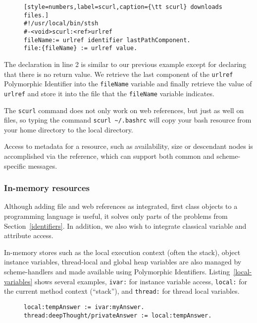 \documentclass[preprint]{sigplanconf}
\begin{document}
\begin{figure}[htbp]
\begin{lstlisting}[style=numbers,label=scurl,caption={\tt scurl} downloads files.]
#!/usr/local/bin/stsh
#-<void>scurl:<ref>urlref
fileName:= urlref identifier lastPathComponent.
file:{fileName} := urlref value.
\end{lstlisting}
\end{figure}


The declaration in line 2 is similar to our previous example except for declaring that there
is no return value.   We retrieve the last component of the {\tt urlref} Polymorphic Identifier into the {\tt fileName}
variable and finally retrieve the value of  {\tt urlref} and store it into the file that
the {\tt fileName} variable indicates.

The {\tt scurl} command does not only work on web references, but just as well
on files, so typing the command {\tt scurl \~\//.bashrc} will copy your bash resource from your home directory
to the local directory.

Access to metadata for a resource, such as availability, size or descendant nodes
is accomplished via the reference, which can support both common and scheme-specific
messages.

\subsubsection{In-memory resources}
\label{inmemory}

Although adding file and web references as integrated, first class objects to a programming
language is useful, it solves only parts of the problems from Section~\ref{identifiers}.
In addition, we also wish to integrate classical variable and attribute access.

In-memory stores such as the local execution context (often the stack), object instance
variables, thread-local and global heap variables are also managed by scheme-handlers
and made available using Polymorphic Identifiers.  Listing~\ref{local-variables} shows
several examples, {\tt ivar:} for instance variable access, {\tt local:} for the current
method context (``stack''), and {\tt thread:} for thread local variables.

\begin{figure}[htbp]
\begin{lstlisting}[style=numbers,label=local-variables,caption=Different memory variables.]
local:tempAnswer := ivar:myAnswer.
thread:deepThought/privateAnswer := local:tempAnswer.
\end{lstlisting}
\end{figure}
\end{document}
